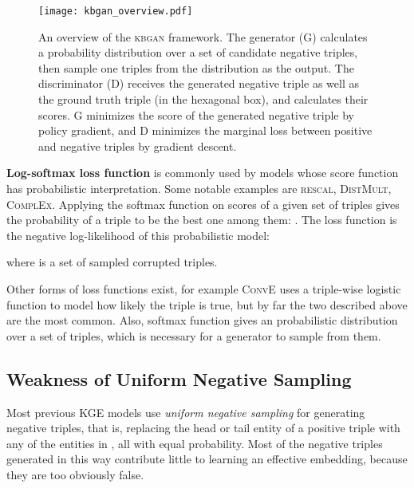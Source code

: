 \documentclass[11pt,a4paper]{article}
\begin{document}
\begin{figure*}[t]
  \centering
    \texttt{[image: kbgan\_overview.pdf]}
  \caption{An overview of the \textsc{kbgan} framework. The generator (G) calculates a probability distribution over a set of candidate negative triples, then sample one triples from the distribution as the output. The discriminator (D) receives the generated negative triple as well as the ground truth triple (in the hexagonal box), and calculates their scores. G minimizes the score of the generated negative triple by policy gradient, and D minimizes the marginal loss between positive and negative triples by gradient descent.}
  \label{fig:overview}
\end{figure*}

\noindent \textbf{Log-softmax loss function} is commonly used by models whose score function has probabilistic interpretation. Some notable examples are \textsc{rescal}, \textsc{DistMult}, \textsc{ComplEx}. Applying the softmax function on scores of a given set of triples gives the probability of a triple to be the best one among them: . The loss function is the negative log-likelihood of this probabilistic model:

where  is a set of sampled corrupted triples.

Other forms of loss functions exist, for example \textsc{ConvE} uses a triple-wise logistic function to model how likely the triple is true, but by far the two described above are the most common. Also, softmax function gives an probabilistic distribution over a set of triples, which is necessary for a generator to sample from them.

\subsection{Weakness of Uniform Negative Sampling}

Most previous KGE models use \emph{uniform negative sampling} for generating negative triples, that is, replacing the head or tail entity of a positive triple with any of the entities in , all with equal probability. Most of the negative triples generated in this way contribute little to learning an effective embedding, because they are too obviously false.
\end{document}

